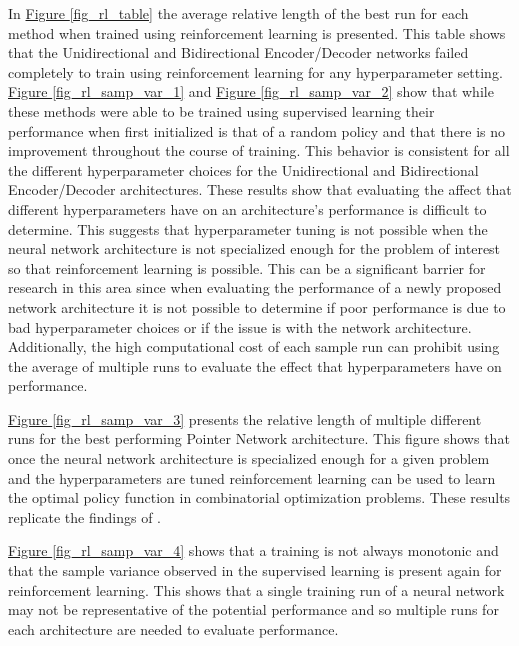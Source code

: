 \documentclass[12pt]{article}
\begin{document}
In \hyperref[fig_rl_table]{Figure \ref{fig_rl_table}} the average relative length of the best run for each method when trained using reinforcement learning is presented. This table shows that the Unidirectional and Bidirectional Encoder/Decoder networks failed completely to train using reinforcement learning for any hyperparameter setting. \hyperref[fig_rl_samp_var_1]{Figure \ref{fig_rl_samp_var_1}} and \hyperref[fig_rl_samp_var_2]{Figure \ref{fig_rl_samp_var_2}} show that while these methods were able to be trained using supervised learning their performance when first initialized is that of a random policy and that there is no improvement throughout the course of training. This behavior is consistent for all the different hyperparameter choices for the Unidirectional and Bidirectional Encoder/Decoder architectures. These results show that evaluating the affect that different hyperparameters have on an architecture's performance is difficult to determine. This suggests that hyperparameter tuning is not possible when the neural network architecture is not specialized enough for the problem of interest so that reinforcement learning is possible. This can be a significant barrier for research in this area since when evaluating the performance of a newly proposed network architecture it is not possible to determine if poor performance is due to bad hyperparameter choices or if the issue is with the network architecture. Additionally, the high computational cost of each sample run can prohibit using the average of multiple runs to evaluate the effect that hyperparameters have on performance.

\hyperref[fig_rl_samp_var_3]{Figure \ref{fig_rl_samp_var_3}} presents the relative length of multiple different runs for the best performing Pointer Network architecture. This figure shows that once the neural network architecture is specialized enough for a given problem and the hyperparameters are tuned reinforcement learning can be used to learn the optimal policy function in combinatorial optimization problems. These results replicate the findings of \citet{2016_Bello}.

\hyperref[fig_rl_samp_var_4]{Figure \ref{fig_rl_samp_var_4}} shows that a training is not always monotonic and that the sample variance observed in the supervised learning is present again for reinforcement learning. This shows that a single training run of a neural network may not be representative of the potential performance and so multiple runs for each architecture are needed to evaluate performance.
\end{document}
